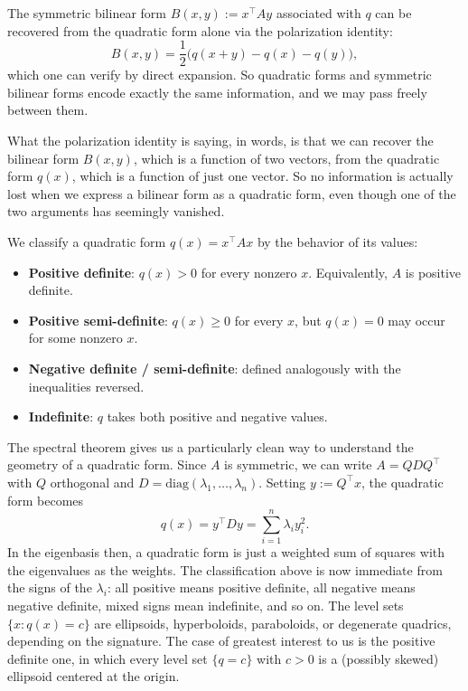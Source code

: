 \documentclass{article}
\begin{document}
The symmetric bilinear form $B(x, y) := x^\top A y$ associated with $q$ can be recovered from the quadratic form alone via the polarization identity:
$$B(x, y) = \frac{1}{2} \big( q(x + y) - q(x) - q(y) \big),$$
which one can verify by direct expansion. So quadratic forms and symmetric bilinear forms encode exactly the same information, and we may pass freely between them.
 
What the polarization identity is saying, in words, is that we can recover the bilinear form $B(x, y)$, which is a function of two vectors, from the quadratic form $q(x)$, which is a function of just one vector. So no information is actually lost when we express a bilinear form as a quadratic form, even though one of the two arguments has seemingly vanished.
 
We classify a quadratic form $q(x) = x^\top A x$ by the behavior of its values:
\begin{itemize}
    \item \textbf{Positive definite}: $q(x) > 0$ for every nonzero $x$. Equivalently, $A$ is positive definite.
    \item \textbf{Positive semi-definite}: $q(x) \geq 0$ for every $x$, but $q(x) = 0$ may occur for some nonzero $x$.
    \item \textbf{Negative definite / semi-definite}: defined analogously with the inequalities reversed.
    \item \textbf{Indefinite}: $q$ takes both positive and negative values.
\end{itemize}
 
The spectral theorem gives us a particularly clean way to understand the geometry of a quadratic form. Since $A$ is symmetric, we can write $A = QDQ^\top$ with $Q$ orthogonal and $D = \mathrm{diag}(\lambda_1, \dots, \lambda_n)$. Setting $y := Q^\top x$, the quadratic form becomes
$$q(x) = y^\top D y = \sum_{i=1}^n \lambda_i y_i^2.$$
In the eigenbasis then, a quadratic form is just a weighted sum of squares with the eigenvalues as the weights. The classification above is now immediate from the signs of the $\lambda_i$: all positive means positive definite, all negative means negative definite, mixed signs mean indefinite, and so on. The level sets $\{x : q(x) = c\}$ are ellipsoids, hyperboloids, paraboloids, or degenerate quadrics, depending on the signature. The case of greatest interest to us is the positive definite one, in which every level set $\{q = c\}$ with $c > 0$ is a (possibly skewed) ellipsoid centered at the origin.
 
\end{document}
